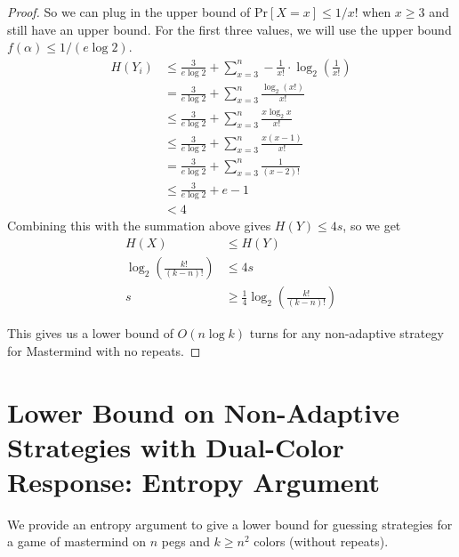 \documentclass[12pt, a4paper]{article}
\begin{document}
\begin{proof}
So we can plug in the upper bound of $\text{Pr}[X=x]\le 1/x!$ when $x\ge 3$ and
still have an upper bound. For the first three values, we will use the upper bound
$f(\alpha)\le 1/(e\log 2)$. 
    \begin{align*}
    H(Y_i) &\leq \frac{3}{e\log 2}+\sum_{x=3}^n-\frac{1}{x!}\cdot\log_2(\frac{1}{x!})\\
    &= \frac{3}{e\log 2}+\sum_{x=3}^n \frac{\log_2(x!)}{x!}\\
    &\leq \frac{3}{e\log 2}+\sum_{x=3}^n \frac{x \log_2 x}{x!}\\
    &\leq \frac{3}{e\log 2}+\sum_{x=3}^n \frac{x (x-1)}{x!}\\
    &= \frac{3}{e\log 2}+\sum_{x=3}^n \frac{1}{(x-2)!}\\
    &\leq \frac{3}{e\log 2}+e-1\\
    & < 4
    \end{align*}
Combining this with the summation above gives $H(Y) \leq 4s$, so we get
	\begin{align*}
	H(X) &\leq H(Y)\\
	\log_2\left(\frac{k!}{(k-n)!}\right) &\leq 4s\\
	s &\geq \frac{1}{4}\log_2\left(\frac{k!}{(k-n)!}\right)
	\end{align*}

This gives us a lower bound of $O(n \log k)$ turns for any non-adaptive strategy for
Mastermind with no repeats.
\end{proof}

\clearpage
\section*{Lower Bound on Non-Adaptive Strategies with Dual-Color Response: Entropy
Argument}
We provide an entropy argument to give a lower bound for guessing strategies for a
game of mastermind on $n$ pegs and $k\ge n^2$ colors (without repeats).
\end{document}
